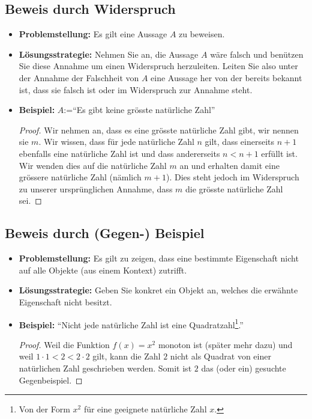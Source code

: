 \subsection*{Beweis durch Widerspruch}
\begin{itemize}
 \item[] \textbf{Problemstellung:} Es gilt eine Aussage $A$ zu beweisen.
\item[] \textbf{Lösungsstrategie:} Nehmen Sie an, die Aussage $A$ wäre falsch und benützen Sie diese Annahme um einen Widerspruch herzuleiten. Leiten Sie also unter der Annahme der Falschheit von $A$ eine Aussage her von der bereits bekannt ist, dass sie falsch ist oder im Widerspruch zur Annahme steht.
\item[]\textbf{Beispiel:} $A$:=``Es gibt keine grösste natürliche Zahl''
\begin{proof}
 Wir nehmen an, dass es eine grösste natürliche Zahl gibt, wir nennen sie $m$. Wir wissen, dass
für jede natürliche Zahl $n$ gilt, dass einerseits $n+1$ ebenfalls eine natürliche Zahl ist und dass
andererseits $n<n+1$ erfüllt ist. Wir wenden dies auf die natürliche Zahl $m$ an und erhalten
damit eine grössere natürliche Zahl (nämlich $m+1$). Dies steht jedoch im
Widerspruch zu unserer ursprünglichen Annahme, dass $m$ die grösste natürliche Zahl sei.
\end{proof}
\end{itemize}

\subsection*{Beweis durch (Gegen-) Beispiel}
\begin{itemize}
 \item[] \textbf{Problemstellung:} Es gilt zu zeigen, dass eine bestimmte Eigenschaft nicht auf alle Objekte (aus einem Kontext) zutrifft.
\item[] \textbf{Lösungsstrategie:} Geben Sie konkret ein Objekt an, welches die erwähnte Eigenschaft nicht besitzt.
\item[]\textbf{Beispiel:} ``Nicht jede natürliche Zahl ist eine Quadratzahl\footnote{Von der Form $x^2$ für eine geeignete natürliche Zahl $x$.}.''
\begin{proof}
Weil die Funktion $f(x)=x^2$ monoton ist (später mehr dazu) und weil $1\cdot1<2<2\cdot2$ gilt, kann die Zahl $2$ nicht als Quadrat von einer natürlichen Zahl geschrieben werden. Somit ist $2$ das (oder ein) gesuchte Gegenbeispiel.
\end{proof}
\end{itemize}

